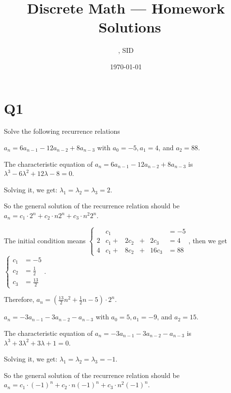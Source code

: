 \documentclass[11pt]{article}
\title{Discrete Math --- Homework \Homework \ Solutions}
\author{\Name, SID \SID}
\date{\today}
\begin{document}
\maketitle

\section*{Q1}
Solve the following recurrence relations
\begin{qparts}
    
    \item $a_n=6a_{n-1}-12a_{n-2}+8a_{n-3}$ with 
    $a_0=-5,a_1=4$, and $a_2=88$.
    \begin{solution}
        The characteristic equation of $a_n=6a_{n-1}-12a_{n-2}+8a_{n-3}$ is $\lambda ^{3}-6\lambda ^{2}+12\lambda-8=0$. 
    
    Solving it, we get: $\lambda_1=\lambda_2=\lambda_3=2$. 
    
    So the general solution of the recurrence relation should be 
    $a_n=c_1\cdot 2^{n}+c_2\cdot n2^{n}+c_3\cdot n^{2}2^{n}$.

    The initial condition means 
    $\left\{
        \begin{alignedat}{4}
            &c_1&&&&=-5\\
            2&c_1+{}&2c_2&+{}&2c_3&=4\\
            4&c_1+{}&8c_2&+{}&16c_3&=88
        \end{alignedat}
    \right.
    $, then we get $
    \left\{
        \begin{alignedat}{2}
            c_1&=-5\\
            c_2&=\frac{1}{2}\\
            c_3&=\frac{13}{2}
        \end{alignedat}
    \right.$.

    Therefore, $a_n=\left( \frac{13}{2}n^{2}+\frac{1}{2}n-5 \right)\cdot 2^{n} $.
    \end{solution}
    
    \item $a_n=-3a_{n-1}-3a_{n-2}-a_{n-3}$ with 
    $a_0=5,a_1=-9$, and $a_2=15$.
    \begin{solution}
        The characteristic equation of $a_n=-3a_{n-1}-3a_{n-2}-a_{n-3}$ is $\lambda ^{3}+3\lambda ^{2}+3\lambda+1=0$. 
    
    Solving it, we get: $\lambda_1=\lambda_2=\lambda_3=-1$. 
    
    So the general solution of the recurrence relation should be 
    $a_n=c_1\cdot (-1)^{n}+c_2\cdot n(-1)^{n}+c_3\cdot n^{2}(-1)^{n}$.


\end{solution}
\end{qparts}
\end{document}
